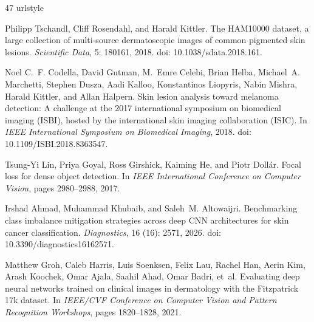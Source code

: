 \documentclass[11pt]{article}
\begin{document}
\begin{thebibliography}{47}
\providecommand{\natexlab}[1]{#1}
\providecommand{\url}[1]{\texttt{#1}}
\expandafter\ifx\csname urlstyle\endcsname\relax
  \providecommand{\doi}[1]{doi: #1}\else
  \providecommand{\doi}{doi: \begingroup \urlstyle{rm}\Url}\fi

Philipp Tschandl, Cliff Rosendahl, and Harald Kittler.
\newblock The {HAM10000} dataset, a large collection of multi-source
  dermatoscopic images of common pigmented skin lesions.
\newblock \emph{Scientific Data}, 5: 180161, 2018.
\newblock \doi{10.1038/sdata.2018.161}.

Noel C.~F. Codella, David Gutman, M.~Emre Celebi, Brian Helba, Michael~A.
  Marchetti, Stephen Dusza, Aadi Kalloo, Konstantinos Liopyris, Nabin Mishra,
  Harald Kittler, and Allan Halpern.
\newblock Skin lesion analysis toward melanoma detection: A challenge at the
  2017 international symposium on biomedical imaging ({ISBI}), hosted by the
  international skin imaging collaboration ({ISIC}).
\newblock In \emph{IEEE International Symposium on Biomedical Imaging}, 2018.
\newblock \doi{10.1109/ISBI.2018.8363547}.

Tsung-Yi Lin, Priya Goyal, Ross Girshick, Kaiming He, and Piotr Doll{\'a}r.
\newblock Focal loss for dense object detection.
\newblock In \emph{IEEE International Conference on Computer Vision}, pages
  2980--2988, 2017.

Irshad Ahmad, Muhammad Khubaib, and Saleh~M. Altowaijri.
\newblock Benchmarking class imbalance mitigation strategies across deep {CNN}
  architectures for skin cancer classification.
\newblock \emph{Diagnostics}, 16 (16): 2571, 2026.
\newblock \doi{10.3390/diagnostics16162571}.

Matthew Groh, Caleb Harris, Luis Soenksen, Felix Lau, Rachel Han, Aerin Kim,
  Arash Koochek, Omar Ajala, Saahil Ahad, Omar Badri, et~al.
\newblock Evaluating deep neural networks trained on clinical images in
  dermatology with the {Fitzpatrick 17k} dataset.
\newblock In \emph{IEEE/CVF Conference on Computer Vision and Pattern
  Recognition Workshops}, pages 1820--1828, 2021.


\end{thebibliography}
\end{document}
